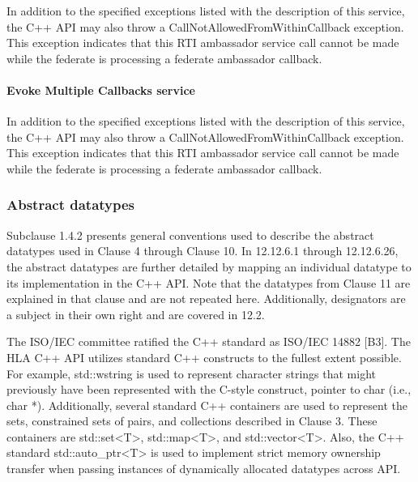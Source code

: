 \begin{compactstdpage}
    In addition to the specified exceptions listed with the description of this service, the C++ API may also throw a CallNotAllowedFromWithinCallback exception. This exception indicates that this RTI ambassador service call cannot be made while the federate is processing a federate ambassador callback.

    \paragraph{Evoke Multiple Callbacks service}

    In addition to the specified exceptions listed with the description of this service, the C++ API may also throw a CallNotAllowedFromWithinCallback exception. This exception indicates that this RTI ambassador service call cannot be made while the federate is processing a federate ambassador callback.

    \subsubsection{Abstract datatypes}

    Subclause 1.4.2 presents general conventions used to describe the abstract datatypes used in Clause 4 through Clause 10. In 12.12.6.1 through 12.12.6.26, the abstract datatypes are further detailed by mapping an individual datatype to its implementation in the C++ API. Note that the datatypes from Clause 11 are explained in that clause and are not repeated here. Additionally, designators are a subject in their own right and are covered in 12.2.

    The ISO/IEC committee ratified the C++ standard as ISO/IEC 14882 [B3]. The HLA C++ API utilizes standard C++ constructs to the fullest extent possible. For example, std::wstring is used to represent character strings that might previously have been represented with the C-style construct, pointer to char (i.e., char *). Additionally, several standard C++ containers are used to represent the sets, constrained sets of pairs, and collections described in Clause 3. These containers are std::set\textless{}T\textgreater{}, std::map\textless{}T\textgreater{}, and std::vector\textless{}T\textgreater{}. Also, the C++ standard std::auto\_ptr\textless{}T\textgreater{} is used to implement strict memory ownership transfer when passing instances of dynamically allocated datatypes across API.

\end{compactstdpage}

